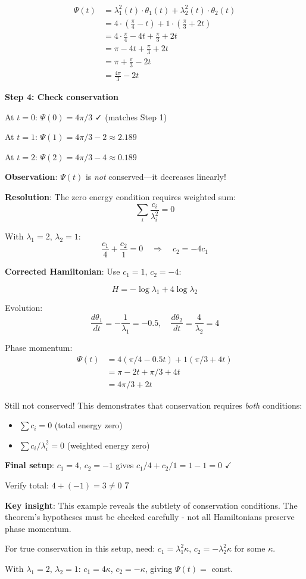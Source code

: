 \begin{example}
\begin{align}
\Psi(t) &= \lambda_1^2(t) \cdot \theta_1(t) + \lambda_2^2(t) \cdot \theta_2(t) \\
&= 4 \cdot \left(\frac{\pi}{4} - t\right) + 1 \cdot \left(\frac{\pi}{3} + 2t\right) \\
&= 4 \cdot \frac{\pi}{4} - 4t + \frac{\pi}{3} + 2t \\
&= \pi - 4t + \frac{\pi}{3} + 2t \\
&= \pi + \frac{\pi}{3} - 2t \\
&= \frac{4\pi}{3} - 2t
\end{align}

\textbf{Step 4: Check conservation}

At $t=0$: $\Psi(0) = 4\pi/3$ ✓ (matches Step 1)

At $t=1$: $\Psi(1) = 4\pi/3 - 2 \approx 2.189$

At $t=2$: $\Psi(2) = 4\pi/3 - 4 \approx 0.189$

\textbf{Observation}: $\Psi(t)$ is \textit{not} conserved—it decreases linearly!

\textbf{Resolution}: The zero energy condition requires weighted sum:
$$\sum_i \frac{c_i}{\lambda_i^2} = 0$$

With $\lambda_1 = 2$, $\lambda_2 = 1$:
$$\frac{c_1}{4} + \frac{c_2}{1} = 0 \quad \Rightarrow \quad c_2 = -4c_1$$

\textbf{Corrected Hamiltonian}: Use $c_1 = 1$, $c_2 = -4$:

$$H = -\log\lambda_1 + 4\log\lambda_2$$

Evolution:
$$\frac{d\theta_1}{dt} = -\frac{1}{\lambda_1} = -0.5, \quad \frac{d\theta_2}{dt} = \frac{4}{\lambda_2} = 4$$

Phase momentum:
\begin{align}
\Psi(t) &= 4(\pi/4 - 0.5t) + 1(\pi/3 + 4t) \\
&= \pi - 2t + \pi/3 + 4t \\
&= 4\pi/3 + 2t
\end{align}

Still not conserved! This demonstrates that conservation requires \textit{both} conditions:
\begin{itemize}
\item $\sum c_i = 0$ (total energy zero)
\item $\sum c_i/\lambda_i^2 = 0$ (weighted energy zero)
\end{itemize}

\textbf{Final setup}: $c_1 = 4$, $c_2 = -1$ gives $c_1/4 + c_2/1 = 1 - 1 = 0$ $\checkmark$

Verify total: $4 + (-1) = 3 \neq 0$ $\xmark$

\textbf{Key insight}: This example reveals the subtlety of conservation conditions. The theorem's hypotheses must be checked carefully - not all Hamiltonians preserve phase momentum.

For true conservation in this setup, need: $c_1 = \lambda_1^2 \kappa$, $c_2 = -\lambda_2^2 \kappa$ for some $\kappa$.

With $\lambda_1 = 2$, $\lambda_2 = 1$: $c_1 = 4\kappa$, $c_2 = -\kappa$, giving $\Psi(t) = $ const.
\end{example}

